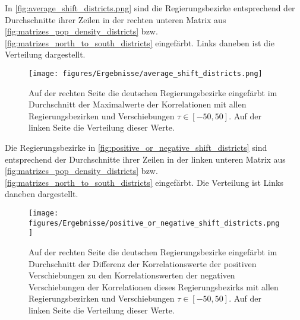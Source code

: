 In \autoref{fig:average_shift_districts.png} sind die Regierungsbezirke entsprechend der Durchschnitte ihrer Zeilen in der rechten unteren Matrix aus \autoref{fig:matrizes_pop_density_districts} bzw. \autoref{fig:matrizes_north_to_south_districts} eingefärbt. Links daneben ist die Verteilung dargestellt.

\begin{figure}[H]
    \centering
    \texttt{[image: figures/Ergebnisse/average\_shift\_districts.png]}
    \caption{Auf der rechten Seite die deutschen Regierungsbezirke eingefärbt im Durchschnitt der Maximalwerte der Korrelationen mit allen Regierungsbezirken und Verschiebungen $\tau\in[-50,50]$. Auf der linken Seite die Verteilung dieser Werte.}
    \label{fig:average_shift_districts.png}
\end{figure}

Die Regierungsbezirke in \autoref{fig:positive_or_negative_shift_districts} sind  entsprechend der Durchschnitte ihrer Zeilen in der linken unteren Matrix aus \autoref{fig:matrizes_pop_density_districts} bzw. \autoref{fig:matrizes_north_to_south_districts} eingefärbt. Die Verteilung ist Links daneben dargestellt.

\begin{figure}[H]
    \centering
    \texttt{[image: figures/Ergebnisse/positive\_or\_negative\_shift\_districts.png]}
    \caption{Auf der rechten Seite die deutschen Regierungsbezirke eingefärbt im Durchschnitt der Differenz der Korrelationswerte der positiven Verschiebungen zu den Korrelationswerten der negativen Verschiebungen der Korrelationen dieses Regierungsbezirks mit allen Regierungsbezirken und Verschiebungen $\tau\in[-50,50]$. Auf der linken Seite die Verteilung dieser Werte.}
    \label{fig:positive_or_negative_shift_districts}
\end{figure}

